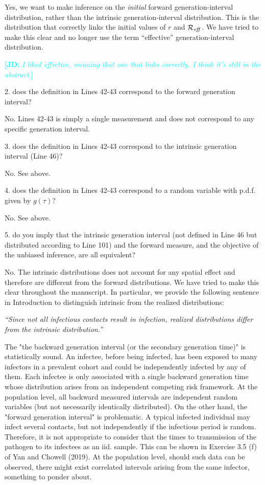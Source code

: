 \documentclass[12pt]{article}
\newcommand{\Rx}[1]{\ensuremath{{\cal R}_{#1}}}
\newcommand{\Reff}{\Rx{\mathit{eff}}}
\newcommand{\revtext}{\textsf}
\newcommand{\newtext}[1]{\textsl{``#1''}}
\newcommand{\comment}[3]{\textcolor{#1}{\textbf{[#2: }\textsl{#3}\textbf{]}}}
\newcommand{\jd}[1]{\comment{cyan}{JD}{#1}}
\begin{document}
Yes, we want to make inference on the \emph{initial} forward generation-interval distribution, rather than the intrinsic generation-interval distribution.
This is the distribution that correctly links the initial values of $r$ and \Reff.
We have tried to make this clear and no longer use the term ``effective'' generation-interval distribution.

\jd{I liked effective, meaning that one that links correctly. I think it's still in the abstract.}

\revtext{2. does the definition in Lines 42-43 correspond to the forward generation
interval?}

No. Lines 42-43 is simply a single measurement and does not correspond to any specific generation interval.

\revtext{3. does the definition in Lines 42-43 correspond to the intrinsic generation
interval (Line 46)?}

No. See above.

\revtext{4. does the definition in Lines 42-43 correspond to a random variable with
p.d.f. given by $g(\tau)$?}

No. See above.

\revtext{5. do you imply that the intrinsic generation interval (not defined in Line 46
but distributed according to Line 101) and the forward measure, and the
objective of the unbiased inference, are all equivalent?}

No. The intrinsic distributions does not account for any spatial effect and therefore are different from the forward distributions.
We have tried to make this clear throughout the manuscript.
In particular, we provide the following sentence in Introduction to distinguish intrinsic from the realized distributions:

\newtext{Since not all infectious contacts result in infection, realized distributions differ from the intrinsic distribution.}

\revtext{
The "the backward generation interval (or the secondary generation time)" is statistically sound. An infectee, before being infected, has been exposed to many infectors in a prevalent cohort and
could be independently infected by any of them. Each infectee is only associated with a single backward generation time whose distribution arises
from an independent competing risk framework. At the population level,
all backward measured intervals are independent random variables (but
not necessarily identically distributed). On the other hand, the "forward
generation interval" is problematic. A typical infected individual may
infect several contacts, but not independently if the infectious period is
random. Therefore, it is not appropriate to consider that the times to
transmission of the pathogen to its infectees as an iid. sample. This can
be shown in Exercise 3.5 (f) of Yan and Chowell (2019). At the population level, should such data can be observed, there might exist correlated
intervals arising from the same infector, something to ponder about.
}
\end{document}
